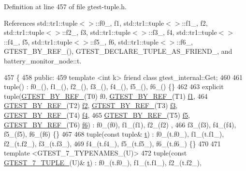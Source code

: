 Definition at line 457 of file gtest-\/tuple.\+h.



References std\+::tr1\+::tuple$<$$>$\+::f0\+\_\+, f1, std\+::tr1\+::tuple$<$$>$\+::f1\+\_\+, f2, std\+::tr1\+::tuple$<$$>$\+::f2\+\_\+, f3, std\+::tr1\+::tuple$<$$>$\+::f3\+\_\+, f4, std\+::tr1\+::tuple$<$$>$\+::f4\+\_\+, f5, std\+::tr1\+::tuple$<$$>$\+::f5\+\_\+, f6, std\+::tr1\+::tuple$<$$>$\+::f6\+\_\+, G\+T\+E\+S\+T\+\_\+\+B\+Y\+\_\+\+R\+E\+F\+\_\+(), G\+T\+E\+S\+T\+\_\+\+D\+E\+C\+L\+A\+R\+E\+\_\+\+T\+U\+P\+L\+E\+\_\+\+A\+S\+\_\+\+F\+R\+I\+E\+N\+D\+\_\+, and battery\+\_\+monitor\+\_\+node\+::t.


\begin{DoxyCode}
457                         \{
458  \textcolor{keyword}{public}:
459   \textcolor{keyword}{template} <\textcolor{keywordtype}{int} k> \textcolor{keyword}{friend} \textcolor{keyword}{class }gtest\_internal::Get;
460 
461   tuple() : f0\_(), f1\_(), f2\_(), f3\_(), f4\_(), f5\_(), f6\_() \{\}
462 
463   \textcolor{keyword}{explicit} tuple(\hyperlink{gtest-tuple_8h_adcf9057737a411d833fac0382c13a181}{GTEST\_BY\_REF\_}(T0) f0, \hyperlink{gtest-tuple_8h_adcf9057737a411d833fac0382c13a181}{GTEST\_BY\_REF\_}(T1) 
      \hyperlink{namespacestd_1_1tr1_a9c0fa65b105f8e2f58ba59ecf75fd000}{f1},
464       \hyperlink{gtest-tuple_8h_adcf9057737a411d833fac0382c13a181}{GTEST\_BY\_REF\_}(T2) \hyperlink{namespacestd_1_1tr1_a87dd9e009868361317f587126dba63d4}{f2}, \hyperlink{gtest-tuple_8h_adcf9057737a411d833fac0382c13a181}{GTEST\_BY\_REF\_}(T3) \hyperlink{namespacestd_1_1tr1_a0f7c3b47d27d42d82d1a333ea420ce4e}{f3}, 
      \hyperlink{gtest-tuple_8h_adcf9057737a411d833fac0382c13a181}{GTEST\_BY\_REF\_}(T4) \hyperlink{namespacestd_1_1tr1_adc796e02b7385d526aff708189564f67}{f4},
465       \hyperlink{gtest-tuple_8h_adcf9057737a411d833fac0382c13a181}{GTEST\_BY\_REF\_}(T5) \hyperlink{namespacestd_1_1tr1_a9c1eb66b2b2fa321942af95405232a0d}{f5}, \hyperlink{gtest-tuple_8h_adcf9057737a411d833fac0382c13a181}{GTEST\_BY\_REF\_}(T6) \hyperlink{namespacestd_1_1tr1_a6b62f32e1e3e21bceb94eb46c4cbfd56}{f6}) : f0\_(f0), f1\_(f1), f2\_(f2)
      ,
466       f3\_(f3), f4\_(f4), f5\_(f5), f6\_(f6) \{\}
467 
468   tuple(\textcolor{keyword}{const} tuple& \hyperlink{namespacebattery__monitor__node_a7a63d20d1ea461e280f4eb5b47f925cd}{t}) : f0\_(t.f0\_), f1\_(t.f1\_), f2\_(t.f2\_), f3\_(t.f3\_),
469       f4\_(t.f4\_), f5\_(t.f5\_), f6\_(t.f6\_) \{\}
470 
471   \textcolor{keyword}{template} <GTEST\_7\_TYPENAMES\_(U)>
472   tuple(\textcolor{keyword}{const} \hyperlink{gtest-tuple_8h_a8987baf82ee028d1d778447413a02c0c}{GTEST\_7\_TUPLE\_}(U)& \hyperlink{namespacebattery__monitor__node_a7a63d20d1ea461e280f4eb5b47f925cd}{t}) : f0\_(t.f0\_), f1\_(t.f1\_), f2\_(t.f2\_),

\end{DoxyCode}
